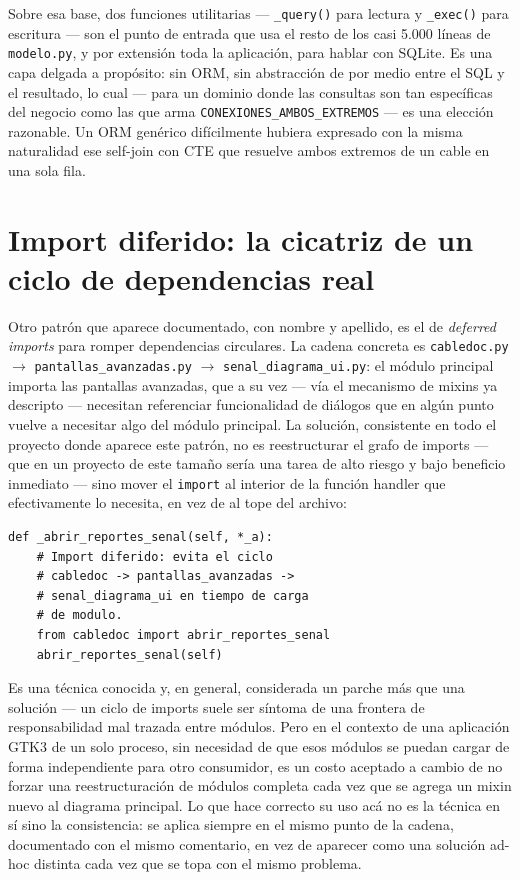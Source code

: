 \documentclass[11pt,twocolumn]{article}
\begin{document}
Sobre esa base, dos funciones utilitarias --- \texttt{\_query()} para lectura y \texttt{\_exec()} para escritura --- son el punto de entrada que usa el resto de los casi 5.000 líneas de \texttt{modelo.py}, y por extensión toda la aplicación, para hablar con SQLite. Es una capa delgada a propósito: sin ORM, sin abstracción de por medio entre el SQL y el resultado, lo cual --- para un dominio donde las consultas son tan específicas del negocio como las que arma \texttt{CONEXIONES\_AMBOS\_EXTREMOS} --- es una elección razonable. Un ORM genérico difícilmente hubiera expresado con la misma naturalidad ese self-join con CTE que resuelve ambos extremos de un cable en una sola fila.

\section{Import diferido: la cicatriz de un ciclo de dependencias real}

Otro patrón que aparece documentado, con nombre y apellido, es el de \emph{deferred imports} para romper dependencias circulares. La cadena concreta es \texttt{cabledoc.py} $\rightarrow$ \texttt{pantallas\_avanzadas.py} $\rightarrow$ \texttt{senal\_diagrama\_ui.py}: el módulo principal importa las pantallas avanzadas, que a su vez --- vía el mecanismo de mixins ya descripto --- necesitan referenciar funcionalidad de diálogos que en algún punto vuelve a necesitar algo del módulo principal. La solución, consistente en todo el proyecto donde aparece este patrón, no es reestructurar el grafo de imports --- que en un proyecto de este tamaño sería una tarea de alto riesgo y bajo beneficio inmediato --- sino mover el \texttt{import} al interior de la función handler que efectivamente lo necesita, en vez de al tope del archivo:

\begin{lstlisting}[caption={Patrón de import diferido, tal como se repite en el proyecto}]
def _abrir_reportes_senal(self, *_a):
    # Import diferido: evita el ciclo
    # cabledoc -> pantallas_avanzadas ->
    # senal_diagrama_ui en tiempo de carga
    # de modulo.
    from cabledoc import abrir_reportes_senal
    abrir_reportes_senal(self)
\end{lstlisting}

Es una técnica conocida y, en general, considerada un parche más que una solución --- un ciclo de imports suele ser síntoma de una frontera de responsabilidad mal trazada entre módulos. Pero en el contexto de una aplicación GTK3 de un solo proceso, sin necesidad de que esos módulos se puedan cargar de forma independiente para otro consumidor, es un costo aceptado a cambio de no forzar una reestructuración de módulos completa cada vez que se agrega un mixin nuevo al diagrama principal. Lo que hace correcto su uso acá no es la técnica en sí sino la consistencia: se aplica siempre en el mismo punto de la cadena, documentado con el mismo comentario, en vez de aparecer como una solución ad-hoc distinta cada vez que se topa con el mismo problema.
\end{document}
